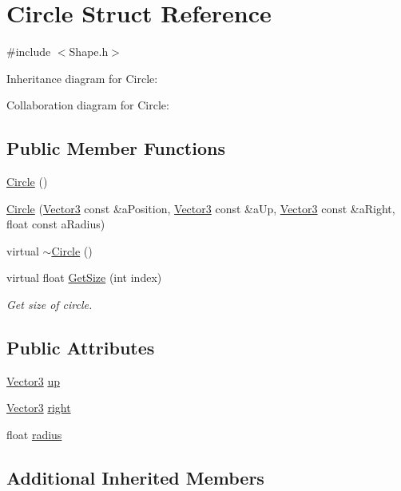 \hypertarget{structCircle}{}\section{Circle Struct Reference}
\label{structCircle}


{\ttfamily \#include $<$Shape.\+h$>$}



Inheritance diagram for Circle\+:


Collaboration diagram for Circle\+:
\subsection*{Public Member Functions}
\begin{DoxyCompactItemize}
\item 
\hyperlink{structCircle_ad1ecfcfc7bf34529c6a6d6c448bf70fe}{Circle} ()
\item 
\hyperlink{structCircle_a2c14dee584a3712e0389bce2a929f0a6}{Circle} (\hyperlink{structVector3}{Vector3} const \&a\+Position, \hyperlink{structVector3}{Vector3} const \&a\+Up, \hyperlink{structVector3}{Vector3} const \&a\+Right, float const a\+Radius)
\item 
virtual \hyperlink{structCircle_ae3f30436e645d73e368e8ee55f8d1650}{$\sim$\+Circle} ()
\item 
virtual float \hyperlink{structCircle_a38451429db18a58f763cee92f1bf1d1c}{Get\+Size} (int index)
\begin{DoxyCompactList}\small\item\em Get size of circle. \end{DoxyCompactList}\end{DoxyCompactItemize}
\subsection*{Public Attributes}
\begin{DoxyCompactItemize}
\item 
\hyperlink{structVector3}{Vector3} \hyperlink{structCircle_a463e9f9c170f3047385ecab17ade6335}{up}
\item 
\hyperlink{structVector3}{Vector3} \hyperlink{structCircle_aeabd8704cb137121c954d503ff6298eb}{right}
\item 
float \hyperlink{structCircle_a47644132ec8bec0f3a4e8d0e15bcd5d3}{radius}
\end{DoxyCompactItemize}
\subsection*{Additional Inherited Members}


